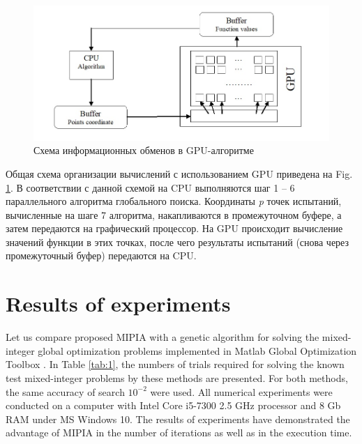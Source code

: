 \documentclass{llncs}
\begin{document}
\begin{figure}[ht]
    \centering
    \includegraphics[width=1.0\textwidth] {fig2.jpg}
    \caption{Схема информационных обменов в GPU-алгоритме}
    \label{fig:2}
\end{figure}

Общая схема организации вычислений с использованием GPU приведена на Fig.  \ref{fig:2}. В соответствии с данной схемой на CPU выполняются шаг 1 – 6 параллельного алгоритма глобального поиска. Координаты \textit{p} точек испытаний, вычисленные на шаге 7 алгоритма, накапливаются в промежуточном буфере, а затем передаются на графический процессор. На GPU происходит вычисление значений функции в этих точках, после чего результаты испытаний (снова через промежуточный буфер) передаются на CPU.




\section{Results of experiments}

Let us compare proposed MIPIA with a genetic algorithm for solving the mixed-integer global optimization problems implemented in Matlab Global Optimization Toolbox \cite{Matlab}. In Table 
\ref{tab:1}, the numbers of trials required for solving the known test mixed-integer 
problems by these methods are presented. For both methods, the same accuracy of search $10^{-2}$ were used. All numerical experiments were conducted on a 
computer with Intel Core i5-7300 2.5 GHz processor and 8 Gb RAM under MS Windows 10. The 
results of experiments have demonstrated the advantage of MIPIA in the number 
of iterations as well as in the execution time.
\end{document}

